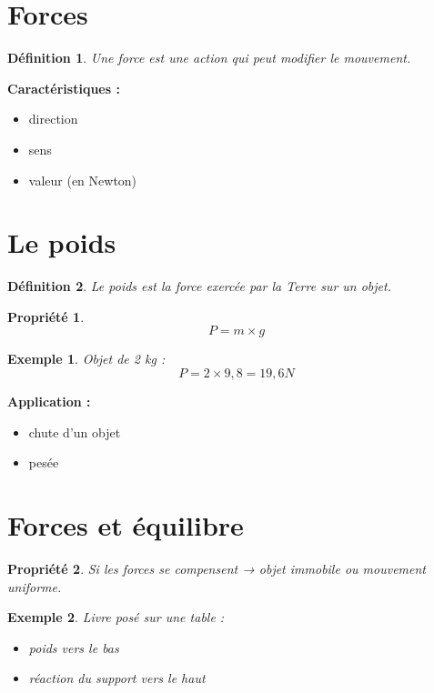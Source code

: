 \documentclass[11pt,a4paper]{article}
\newtheorem{definition}{Définition}
\newtheorem{property}{Propriété}
\newtheorem{example}{Exemple}
\begin{document}
\section{Forces}

\begin{definition}
Une force est une action qui peut modifier le mouvement.
\end{definition}

\textbf{Caractéristiques :}
\begin{itemize}
\item direction
\item sens
\item valeur (en Newton)
\end{itemize}

\section{Le poids}

\begin{definition}
Le poids est la force exercée par la Terre sur un objet.
\end{definition}

\begin{property}
\[
P = m \times g
\]
\end{property}

\begin{example}
Objet de 2 kg :
\[
P = 2 \times 9,8 = 19,6 N
\]
\end{example}

\textbf{Application :}
\begin{itemize}
\item chute d’un objet
\item pesée
\end{itemize}

\section{Forces et équilibre}

\begin{property}
Si les forces se compensent → objet immobile ou mouvement uniforme.
\end{property}

\begin{example}
Livre posé sur une table :
\begin{itemize}
\item poids vers le bas
\item réaction du support vers le haut
\end{itemize}
\end{example}
\end{document}

